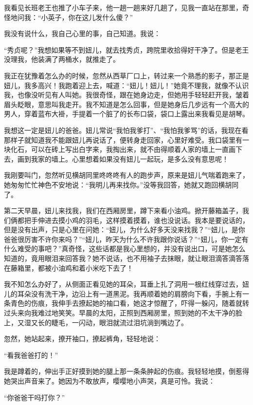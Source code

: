 \par 我看见长班老王也推了小车子来，他一趟一趟来好几趟了，见我一直站在那里，奇怪地问我：“小英子，你在这儿发什么傻？”
\par 我没有说什么，我自己心里的事，自己知道。我说：
\par “秀贞呢？”我想如果等不到妞儿，就去找秀贞，跨院里收拾得好干净了。但是老王没理我，他装满了两桶水，就推走了。
\par 我正在犹豫着怎么办的时候，忽然从西草厂口上，转过来一个熟悉的影子，那正是妞儿，我多高兴！我跑着迎上去，喊道：“妞儿！妞儿！”她竟不理我，就像不认识我，也像没听见有人叫她。我很奇怪，跟在她身边走，但她用手轻轻赶开我，皱着眉头眨眼，意思叫我走开。我不知道是怎么回事，但是她身后几步远有一个高大的男人，穿着蓝布大褂，手提着一个脏了的长布口袋，袋口上露出来我看见是胡琴。
\par 我想这一定是妞儿的爸爸。妞儿常说“我怕我爹打”、“我怕我爹骂”的话，我现在看那样子就知道我不能跟妞儿再说话了，便转身走回家，心里好难受。我口袋里有一块化石，可以在砖上写出白字来，我掏出来，就不由得顺着人家的墙上一直画下去，画到我家的墙上。心里想着如果没有妞儿一起玩，是多么没有意思呢！
\par 我刚要叫门，忽然听见横胡同里咚咚咚有人的跑步声，原来是妞儿气喘着跑来了，她匆匆忙忙神色不安地说：“我明儿再来找你。”没等我回答，她就又跑回横胡同了。
\par 第二天早晨，妞儿来找我，我们在西厢房里，蹲下来看小油鸡。掀开藤箱盖子，我们俩都把手伸进去摸小鸡的羽毛，这样摸着摸着，谁也没说话。我本是要说话的，但是没有出声，只是心里在问她：“妞儿，为什么好多天没来找我？”“妞儿，是你爸爸很厉害不许你来吗？”“妞儿，昨天为什么不许我跟你说话？”“妞儿，你一定有什么难受的事吧？”真奇怪，这些话都是我心里想的，并没有说出口，可是她怎么知道的，竟用眼泪来回答我？她不说话，也不用袖子去抹眼，就让眼泪滴答滴答落在藤箱里，都被小油鸡和着小米吃下去了！
\par 我不知怎么办好了，从侧面正看见她的耳朵，耳垂上扎了洞用一根红线穿过去，妞儿的耳朵没有洗干净，边沿上有一道黑泥。我再顺着她的肩膀向下看，手腕上有一条青色的伤痕，我伸手去撩起她的袖口看，她这才惊醒了，吓得一躲闪，随着就转过头来向我难过地笑笑。早晨的太阳，正照到西厢房里，照到她的不太干净的脸上，又湿又长的睫毛，一闪动，眼泪就流过泪坑淌到嘴边了。
\par 忽然，她站起来，撩开袖口，撩起裤角，轻轻地说：
\par “看我爸爸打的！”
\par 我是蹲着的，伸出手正好摸到她的腿上那一条条肿起的伤痕。我轻轻地摸，倒惹得她哭出声音来了。她因为不敢放声，嘤嘤地小声哭，真是可怜。我说：
\par “你爸爸干吗打你？”
